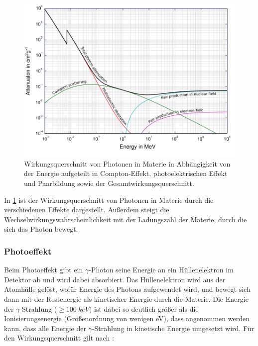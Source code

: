 \documentclass[
	a4paper,
	12pt,
	pagesize,
	ngerman
]{scrartcl}
\begin{document}
	\begin{figure}[H]
			\includegraphics[width= 1 \linewidth]{charts/interaktion}
			\caption{
				Wirkungsquerschnitt von Photonen in Materie in Abhängigkeit von der Energie aufgeteilt in Compton-Effekt, photoelektrischen Effekt und Paarbildung sowie der Gesamtwirkungsquerschnitt.
				\cite{atomkraft}
			}
			\label{fig_wirkunsquerschnitt_gamma}
	\end{figure}

	In \cref{fig_wirkunsquerschnitt_gamma} ist der Wirkungsquerschnitt von Photonen in Materie durch die verschiedenen Effekte dargestellt.
	Außerdem steigt die Wechselwirkungswahrscheinlichkeit mit der Ladungszahl der Materie, durch die sich das Photon bewegt.


	\subsubsection{Photoeffekt}
	Beim Photoeffekt gibt ein $\gamma$-Photon seine Energie an ein Hüllenelektron im Detektor ab und wird dabei absorbiert.
	Das Hüllenelektron wird aus der Atomhülle gelöst, wofür Energie des Photons aufgewendet wird, und bewegt sich dann mit der Restenergie als kinetischer Energie durch die Materie.
	Die Energie der $\gamma$-Strahlung ($\ge \SI{100}{keV}$) ist dabei so deutlich größer als die Ionisierungsenergie (Größenordnung von wenigen \si{}{eV}), dass angenommen werden kann, dass alle Energie der $\gamma$-Strahlung in kinetische Energie umgesetzt wird.
	Für den Wirkungsquerschnitt gilt nach \cite{queensu}:
\end{document}
